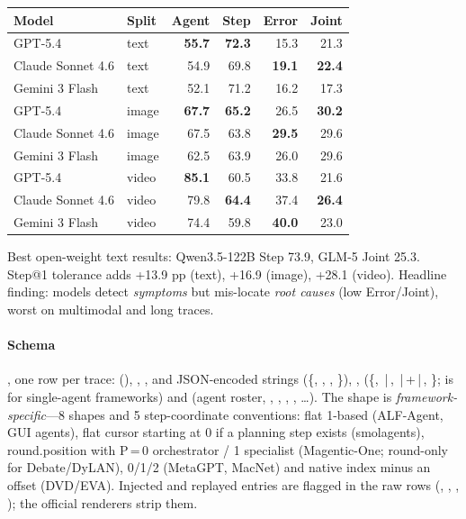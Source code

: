 \begin{center}\footnotesize
\begin{tabular}{@{}llrrrr@{}}\toprule
Model & Split & Agent & Step & Error & Joint\\\midrule
GPT-5.4 & text & \textbf{55.7} & \textbf{72.3} & 15.3 & 21.3\\
Claude Sonnet 4.6 & text & 54.9 & 69.8 & \textbf{19.1} & \textbf{22.4}\\
Gemini 3 Flash & text & 52.1 & 71.2 & 16.2 & 17.3\\\midrule
GPT-5.4 & image & \textbf{67.7} & \textbf{65.2} & 26.5 & \textbf{30.2}\\
Claude Sonnet 4.6 & image & 67.5 & 63.8 & \textbf{29.5} & 29.6\\
Gemini 3 Flash & image & 62.5 & 63.9 & 26.0 & 29.6\\\midrule
GPT-5.4 & video & \textbf{85.1} & 60.5 & 33.8 & 21.6\\
Claude Sonnet 4.6 & video & 79.8 & \textbf{64.4} & 37.4 & \textbf{26.4}\\
Gemini 3 Flash & video & 74.4 & 59.8 & \textbf{40.0} & 23.0\\\bottomrule
\end{tabular}
\end{center}
Best open-weight text results: Qwen3.5-122B Step 73.9, GLM-5 Joint 25.3. Step@1 tolerance adds +13.9 pp (text), +16.9 (image), +28.1 (video). Headline finding: models detect \emph{symptoms} but mis-locate \emph{root causes} (low Error/Joint), worst on multimodal and long traces.

\paragraph{Schema} , one row per trace:  (), , , and JSON-encoded strings  (\{, , , \}), ,  (\{, \,|\,, \,|\,+\,|\,, \};  is  for single-agent frameworks) and  (agent roster, , , , , \ldots). The  shape is \emph{framework-specific}---8 shapes and 5 step-coordinate conventions: flat 1-based  (ALF-Agent, GUI agents), flat cursor starting at 0 if a planning step exists (smolagents),  round.position with P\,=\,0 orchestrator / 1 specialist (Magentic-One; round-only for Debate/DyLAN),  0/1/2 (MetaGPT, MacNet) and native index minus an offset (DVD/EVA). Injected and replayed entries are flagged in the raw rows (, , , ); the official renderers strip them.

